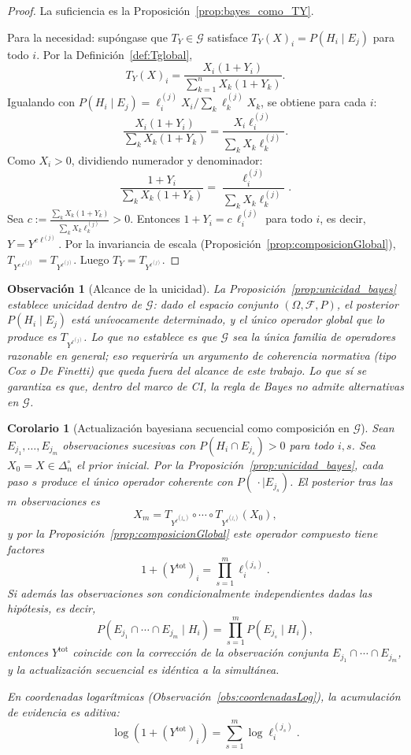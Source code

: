 ﻿\documentclass[12pt]{article}
\newtheorem{corolario}{Corolario}[section]
\newtheorem{observacion}{Observación}[section]
\begin{document}
\begin{proof}
La suficiencia es la Proposición~\ref{prop:bayes_como_TY}.

Para la necesidad: supóngase que $T_Y\in\mathcal{G}$ satisface $T_Y(X)_i = P(H_i\mid E_j)$ para todo $i$. Por la Definición~\ref{def:Tglobal},
\[
T_Y(X)_i = \frac{X_i(1+Y_i)}{\sum_{k=1}^n X_k(1+Y_k)}.
\]
Igualando con $P(H_i\mid E_j) = \ell^{(j)}_i X_i / \sum_k \ell^{(j)}_k X_k$, se obtiene para cada $i$:
\[
\frac{X_i(1+Y_i)}{\sum_{k} X_k(1+Y_k)} = \frac{X_i \ell^{(j)}_i}{\sum_{k} X_k \ell^{(j)}_k}.
\]
Como $X_i>0$, dividiendo numerador y denominador:
\[
\frac{1+Y_i}{\sum_{k} X_k(1+Y_k)} = \frac{\ell^{(j)}_i}{\sum_{k} X_k \ell^{(j)}_k}.
\]
Sea $c := \frac{\sum_k X_k(1+Y_k)}{\sum_k X_k\ell^{(j)}_k} > 0$. Entonces $1+Y_i = c\,\ell^{(j)}_i$ para todo $i$, es decir, $Y = Y^{c\ell^{(j)}}$. Por la invariancia de escala (Proposición~\ref{prop:composicionGlobal}), $T_{Y^{c\ell^{(j)}}} = T_{Y^{\ell^{(j)}}}$. Luego $T_Y = T_{Y^{\ell^{(j)}}}$.
\end{proof}

\begin{observacion}[Alcance de la unicidad]\label{obs:alcance_unicidad}
La Proposición~\ref{prop:unicidad_bayes} establece unicidad dentro de $\mathcal{G}$: dado el espacio conjunto $(\Omega,\mathcal{F},P)$, el posterior $P(H_i\mid E_j)$ está unívocamente determinado, y el único operador global que lo produce es $T_{Y^{\ell^{(j)}}}$. Lo que no establece es que $\mathcal{G}$ sea la única familia de operadores razonable en general; eso requeriría un argumento de coherencia normativa (tipo Cox o De Finetti) que queda fuera del alcance de este trabajo. Lo que sí se garantiza es que, dentro del marco de CI, la regla de Bayes no admite alternativas en $\mathcal{G}$.
\end{observacion}

\begin{corolario}[Actualización bayesiana secuencial como composición en $\mathcal{G}$]\label{cor:bayes_secuencial}
Sean $E_{j_1},\dots,E_{j_m}$ observaciones sucesivas con $P(H_i\cap E_{j_s})>0$ para todo $i,s$. Sea $X_0=X\in\Delta_n^\circ$ el prior inicial. Por la Proposición~\ref{prop:unicidad_bayes}, cada paso $s$ produce el único operador coherente con $P(\,\cdot\mid E_{j_s})$. El posterior tras las $m$ observaciones es
\[
X_m = T_{Y^{\ell^{(j_m)}}}\circ\cdots\circ T_{Y^{\ell^{(j_1)}}}(X_0),
\]
y por la Proposición~\ref{prop:composicionGlobal} este operador compuesto tiene factores
\[
1+(Y^{\mathrm{tot}})_i = \prod_{s=1}^m \ell^{(j_s)}_i.
\]
Si además las observaciones son condicionalmente independientes dadas las hipótesis, es decir,
\[
P(E_{j_1}\cap\cdots\cap E_{j_m}\mid H_i) = \prod_{s=1}^m P(E_{j_s}\mid H_i),
\]
entonces $Y^{\mathrm{tot}}$ coincide con la corrección de la observación conjunta $E_{j_1}\cap\cdots\cap E_{j_m}$, y la actualización secuencial es idéntica a la simultánea.

En coordenadas logarítmicas (Observación~\ref{obs:coordenadasLog}), la acumulación de evidencia es aditiva:
\[
\log(1+(Y^{\mathrm{tot}})_i) = \sum_{s=1}^m \log \ell^{(j_s)}_i.
\]
\end{corolario}
\end{document}
